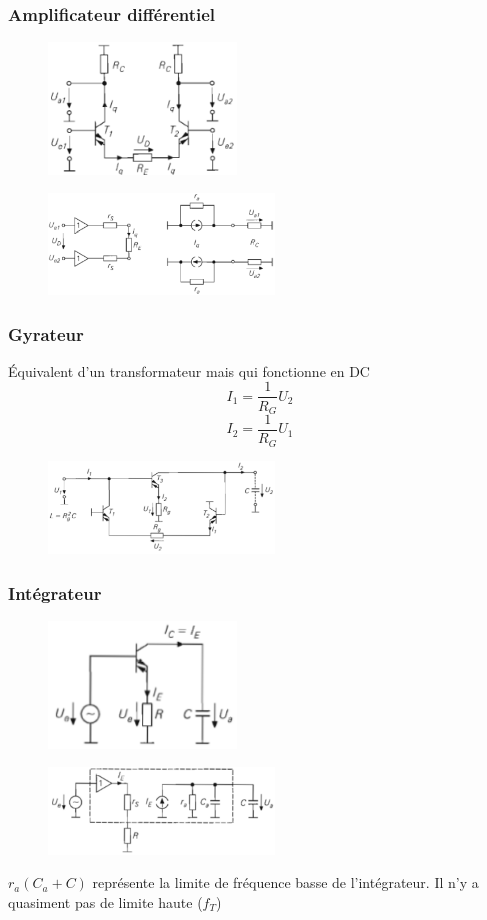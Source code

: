 \documentclass[resume]{subfiles}
\begin{document}
\begin{multicols}{3}
\subsubsection{Amplificateur différentiel}
\begin{figure}[H]
\centering
\includegraphics[width=5.00cm]{img_72.png}
\end{figure}
\begin{figure}[H]
\centering
\includegraphics[width=6.00cm]{img_73.png}
\end{figure}
\subsubsection{Gyrateur}
Équivalent d'un transformateur mais qui fonctionne en DC
$$I_1=\frac{1}{R_G}U_2$$
$$I_2=\frac{1}{R_G}U_1$$
\begin{figure}[H]
\centering
\includegraphics[width=6.00cm]{img_74.png}
\end{figure}
\subsubsection{Intégrateur}
\begin{figure}[H]
\centering
\includegraphics[width=5.00cm]{img_75.png}
\end{figure}
\begin{figure}[H]
\centering
\includegraphics[width=6.00cm]{img_76.png}
\end{figure}
$r_a(C_a+C)$ représente la limite de fréquence basse de l'intégrateur. Il n'y a quasiment pas de limite haute ($f_T$)

\end{multicols}
\end{document}
